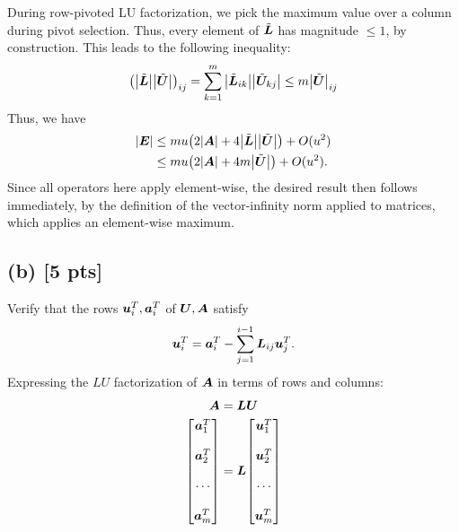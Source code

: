 \documentclass[twoside,10pt]{article}
\begin{document}
\quad During row-pivoted LU factorization, we pick the maximum value over a column during pivot selection.
Thus, every element of $\tilde{\bm{L}}$ has magnitude $\leq 1$, by construction.
This leads to the following inequality:
\begin{equation}
  \left(\left|\tilde{\mtx{L}} \right| \left|\tilde{\mtx{U}}\right|\right)_{ij} = \sum_{k=1}^{m}{\left|\tilde{\mtx{L}}_{ik} \right| \left|\tilde{\mtx{U}}_{kj}\right|} \leq m\left|\tilde{\mtx{U}}\right|_{ij}
\end{equation}
Thus, we have
\begin{align*}
  \left|\mtx{E}\right| &\leq m u \left(2 \left|\mtx{A}\right| + 4 \left|\tilde{\mtx{L}} \right| \left|\tilde{\mtx{U}}\right|\right) + O(u^2)\\
  &\leq m u \left(2 \left|\mtx{A}\right| + 4 m \left|\tilde{\mtx{U}}\right|\right) + O(u^2).
\end{align*}
Since all operators here apply element-wise, the desired result then follows immediately, by the definition of the vector-infinity norm applied to matrices, which applies an element-wise maximum.

\subsection*{(b) [5 pts]}
Verify that the rows $\bm{u}_{i}^{T}, \bm{a}_{i}^{T}$ of $\bm{U}, \bm{A}$ satisfy 
\begin{equation}
  \bm{u}_{i}^{T} = \bm{a}_i^T - \sum \limits_{j = 1}^{i - 1} \bm{L}_{ij} \bm{u}_{j}^T.
\end{equation}
\quad Expressing the $LU$ factorization of $\bm{A}$ in terms of rows and columns:
\begin{align*}
  \mtx{A} &= \mtx{L}\mtx{U}\\
  \begin{bmatrix*}
    \vct{a}_1^T\\\\
    \vct{a}_2^T\\\\
    \cdots\\\\
    \vct{a}_m^T
  \end{bmatrix*}
  &=
  \mtx{L} 
  \begin{bmatrix*}
    \vct{u}_{1}^{T}\\\\
    \vct{u}_{2}^{T}\\\\
    \cdots\\\\\vct{u}_{m}^{T}
  \end{bmatrix*}
\end{align*}
\end{document}
